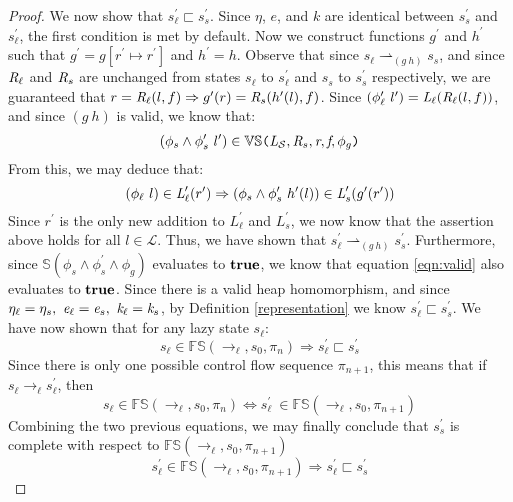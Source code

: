 \begin{proof}
We now show that $s_\ell^\prime \sqsubset s_s^\prime$. Since $\eta$, $e$, and $k$ are identical between $s_s^\prime$ and $s_\ell^\prime $, the first condition is met by default. Now we construct functions $g^\prime$ and $h^\prime$ such that $g^\prime = g[ r^\prime \mapsto r^\prime]$ and $h^\prime = h$. Observe that since $s_\ell \rightharpoonup_{(g\ h)} s_s$, and since $\emph{R}_\ell$ and $\emph{R}_s$ are unchanged from states $s_\ell$ to $s_\ell^\prime$ and $s_s$ to $s_s^\prime$ respectively, we are guaranteed that $ r = \emph{R}_\ell(l,f) \Rightarrow g^\prime(r) = \emph{R}_s(h^\prime(l),f)$. Since $(\phi_\ell^\prime\ l^\prime) =  \emph{L}_\ell(\emph{R}_\ell(l,f))$, and since $(g\ h)$ is valid, we know that:
 $$(\phi_s \wedge \phi_s^\prime\ l^\prime) \in \mathbb{VS}\texttt{(} \emph{L}_{\mathcal{S}},\emph{R}_{s},\emph{r},\emph{f},\phi_g\texttt{)}$$ 
From this, we may deduce that:
$$ (\phi_\ell\ l) \in \cfgnt{L}_\ell^\prime(r^\prime) \Rightarrow (\phi_s \wedge \phi_s^\prime\ h^\prime(l))\in \cfgnt{L}_s^\prime(g^\prime(r^\prime))$$
Since $r^\prime$ is the only new addition to $L_\ell^\prime$ and $L_s^\prime$, we now know that the assertion above holds for all $l \in \mathcal{L}$. Thus, we have shown that $s_\ell^\prime \rightharpoonup_{(g\ h)} s_s^\prime$. Furthermore, since $\mathbb{S}(\phi_s\wedge\phi_s^\prime\wedge \phi_g)$ evaluates to $\textbf{true}$, we know that equation \ref{eqn:valid} also evaluates to $\textbf{true}$. Since there is a valid heap homomorphism, and since $\eta_{\ell} = \eta_{s} ,\ \emph{e}_{\ell} = \emph{e}_{s} ,\ \emph{k}_{\ell} = \emph{k}_{s}$, by Definition \ref{representation} we know $s_\ell^\prime \sqsubset s_s^\prime$. We have now shown that for any lazy state $s_\ell$: 
$$s_\ell \in \mathbb{FS}(\rightarrow_{\ell},s_0,\pi_n) \Rightarrow s_\ell^\prime \sqsubset s_s^\prime$$
Since there is only one possible control flow sequence $\pi_{n+1}$, this means that if $s_\ell \rightarrow_\ell s_\ell^\prime$, then $$s_\ell \in \mathbb{FS}(\rightarrow_{\ell},s_0,\pi_n) \Leftrightarrow s_\ell^\prime\ \in \mathbb{FS}(\rightarrow_{\ell},s_0,\pi_{n+1})$$
Combining the two previous equations, we may finally conclude that $s_s^\prime$ is complete with respect to $\mathbb{FS}(\rightarrow_{\ell},s_0,\pi_{n+1})$
\begin{equation}
\label{eqn:readforwards}
s_\ell^\prime \in \mathbb{FS}(\rightarrow_{\ell},s_0,\pi_{n+1}) \Rightarrow s_\ell^\prime \sqsubset s_s^\prime
\end{equation}



\end{proof}
